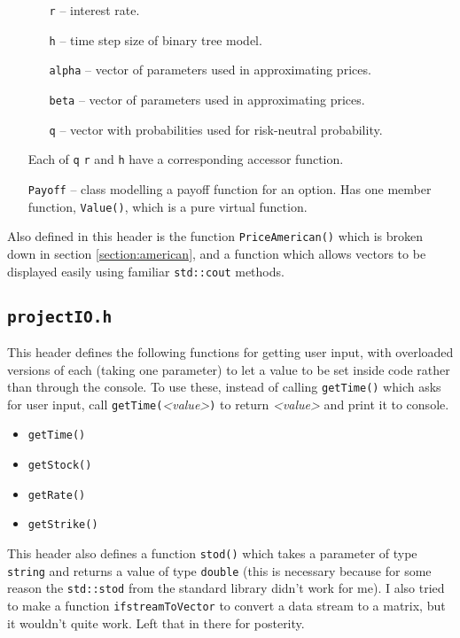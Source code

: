 \documentclass[12pt,a4paper]{article}
\begin{document}
\begin{itemize}
\begin{itemize}
		\item[\texttt{r}] -- interest rate.
		\item[\texttt{h}] -- time step size of binary tree model.
		\item[\texttt{alpha}] -- vector of parameters used in approximating prices.
		\item[\texttt{beta}] -- vector of parameters used in approximating prices.
		\item[\texttt{q}] -- vector with probabilities used for risk-neutral 
probability.
	\end{itemize}
	Each of \texttt{q} \texttt{r} and \texttt{h} have a corresponding accessor 
function.
	\item[\texttt{Payoff}] -- class modelling a payoff function for an option. Has 
one member function, \texttt{Value()}, which is a pure virtual function.
\end{itemize}

Also defined in this header is the function \texttt{PriceAmerican()} which is 
broken down in section \ref{section:american}, and a function which allows 
vectors to be displayed easily using familiar \texttt{std::cout} methods.
 
\subsection{\texttt{projectIO.h}}
This header defines the following functions for getting user input, with 
overloaded versions of each (taking one parameter) to let a value to be set 
inside code rather than through the console. To use these, instead of calling 
\texttt{getTime()} which asks for user input, call 
\texttt{getTime(}\textsl{<value>}\texttt{)} to return \textsl{<value>} and print 
it to console. 
\begin{multicols}{2}
\begin{itemize}
	\item \texttt{getTime()}
	\item \texttt{getStock()}
	\item \texttt{getRate()}
	\item \texttt{getStrike()}
\end{itemize}
\end{multicols}
This header also defines a function \texttt{stod()} which takes a parameter of 
type \texttt{string} and returns a value of type \texttt{double} (this is 
necessary because for some reason the \texttt{std::stod} from the standard 
library didn't work for me). I also tried to make a function 
\texttt{ifstreamToVector} to convert a data stream to a matrix, but it wouldn't 
quite work. Left that in there for posterity.
\end{document}
